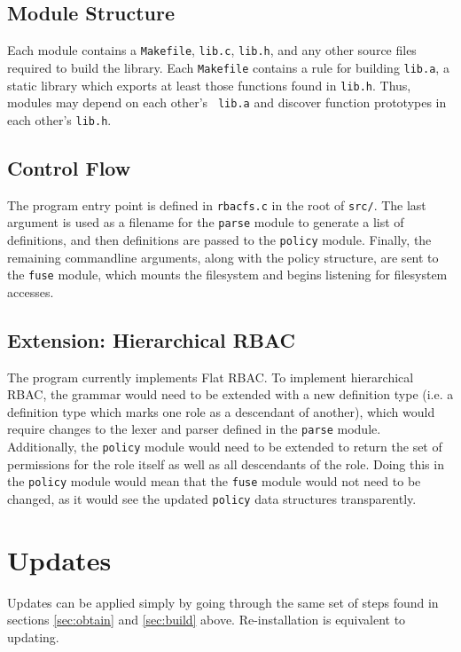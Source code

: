 \documentclass[11pt,oneside,letterpaper]{article}
\begin{document}
\subsection{Module Structure}

Each module contains a {\tt Makefile}, {\tt lib.c}, {\tt lib.h}, and any other
source files required to build the library. Each {\tt Makefile} contains a rule
for building {\tt lib.a}, a static library which exports at least those
functions found in {\tt lib.h}. Thus, modules may depend on each other's {\tt
lib.a} and discover function prototypes in each other's {\tt lib.h}.

\subsection{Control Flow}

The program entry point is defined in {\tt rbacfs.c} in the root of {\tt src/}. The last argument is used as a filename for the {\tt parse} module to
generate a list of definitions, and then definitions are passed to the
{\tt policy} module. Finally, the remaining commandline arguments, along
with the policy structure, are sent to the {\tt fuse} module, which
mounts the filesystem and begins listening for filesystem accesses.

\subsection{Extension: Hierarchical RBAC}

The program currently implements Flat RBAC. To implement hierarchical RBAC, the
grammar would need to be extended with a new definition type (i.e. a definition
type which marks one role as a descendant of another), which would require
changes to the lexer and parser defined in the {\tt parse} module.
Additionally, the {\tt policy} module would need to be extended to return the
set of permissions for the role itself as well as all descendants of the role.
Doing this in the {\tt policy} module would mean that the {\tt fuse} module
would not need to be changed, as it would see the updated {\tt policy} data
structures transparently.

\section{Updates}

Updates can be applied simply by going through the same set of steps found
in sections \ref{sec:obtain} and \ref{sec:build} above. Re-installation is
equivalent to updating.
\end{document}
